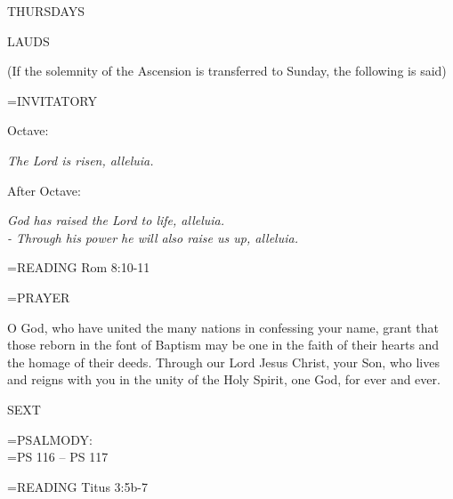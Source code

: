 \begin{center}
\normalsize \begin{center}\normalsize THURSDAYS\\
\end{center}
\end{center}

\begin{flushleft}\normalsize LAUDS\\\end{flushleft}
(If the solemnity of the Ascension is transferred to Sunday, the following is said)

\hangindent=\parindent \small{INVITATORY}
\begin{center}
\end{center}Octave:\begin{center}\textit{	The Lord is risen, alleluia.\\}
\end{center}After Octave:\begin{center}\textit{	God has raised the Lord to life, alleluia.\\}
\textit{- Through his power he will also raise us up, alleluia.\\}
\end{center}

\hangindent=\parindent \small{READING}    Rom 8:10-11 \textbf{   \\}

\hangindent=\parindent \small PRAYER
\begin{description}[labelindent=\parindent, noitemsep, leftmargin=*]
\item [Octave:] 	O God, who have united the many nations in confessing your name, grant that those reborn in the font of Baptism may be one in the faith of their hearts and the homage of their deeds. Through our Lord Jesus Christ, your Son, who lives and reigns with you in the unity of the Holy Spirit, one God, for ever and ever.
\item [After Octave:] 	
\end{description}

\begin{flushleft}\normalsize SEXT\\\end{flushleft}

\hangindent=\parindent \small{PSALMODY:}\\
\hangindent=\parindent  PS 116 -- PS 117\vspace{0.5em}

\hangindent=\parindent \small{READING}    Titus 3:5b-7 \textbf{   }

